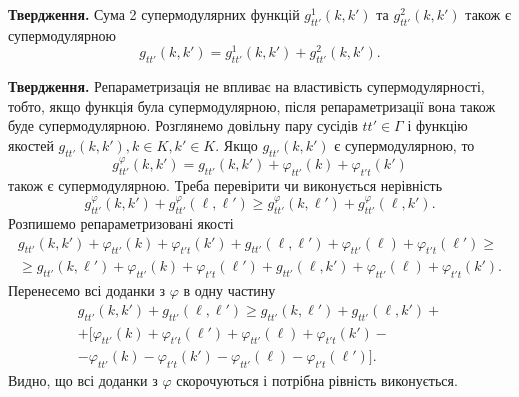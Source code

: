 \textbf{Твердження.}
Сума 2 супермодулярних функцій $g^1_{tt'}(k,k')$ та $g^2_{tt'}(k,k')$ також є супермодулярною
\begin{equation*}
  g_{tt'}(k,k')=g^1_{tt'}(k,k')+g^2_{tt'}(k,k').
\end{equation*}

\textbf{Твердження.}
Репараметризація не впливає на властивість супермодулярності, тобто, якщо функція була
супермодулярною, після репараметризації вона також буде супермодулярною.
Розглянемо довільну пару сусідів $tt'\in\Gamma$ і функцію якостей $g_{tt'}(k,k'), k\in K, k'\in K$.
Якщо $g_{tt'}(k,k')$ є супермодулярною, то
\begin{equation*}
  g^{\varphi}_{tt'}(k,k')=g_{tt'}(k,k') + \varphi_{tt'}(k) + \varphi_{t't}(k')
\end{equation*} також є супермодулярною.
Треба перевірити чи виконується нерівність
\begin{equation*}
  g^{\varphi}_{tt'}(k,k') + g^{\varphi}_{tt'}(\ell,\ell')\geq g^{\varphi}_{tt'}(k,\ell') + g^{\varphi}_{tt'}(\ell,k').
\end{equation*}
Розпишемо репараметризовані якості
\begin{gather*}
  g_{tt'}(k,k') + \varphi_{tt'}(k) + \varphi_{t't}(k') + g_{tt'}(\ell,\ell') + \varphi_{tt'}(\ell) + \varphi_{t't}(\ell') \geq \\
  \geq g_{tt'}(k,\ell') + \varphi_{tt'}(k) + \varphi_{t't}(\ell') + g_{tt'}(\ell,k') + \varphi_{tt'}(\ell) + \varphi_{t't}(k').
\end{gather*}
Перенесемо всі доданки з $\varphi$ в одну частину
\begin{gather*}
  g_{tt'}(k,k') + g_{tt'}(\ell,\ell') \geq g_{tt'}(k,\ell') + g_{tt'}(\ell,k') + \\
  + [\varphi_{tt'}(k) + \varphi_{t't}(\ell')  + \varphi_{tt'}(\ell) + \varphi_{t't}(k')-\\
   -\varphi_{tt'}(k) - \varphi_{t't}(k') - \varphi_{tt'}(\ell) - \varphi_{t't}(\ell')].
\end{gather*}
Видно, що всі доданки з $\varphi$ скорочуються і потрібна рівність виконується.
